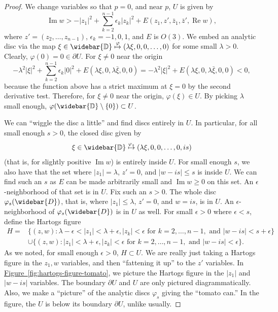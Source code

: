\documentclass[12pt,openany]{book}
\renewcommand{\Re}{\operatorname{Re}}
\renewcommand{\Im}{\operatorname{Im}}
\newcommand{\sabs}[1]{\lvert {#1} \rvert}
\newcommand{\D}{{\mathbb{D}}}
\theoremstyle{plain}
\theoremstyle{remark}
\theoremstyle{definition}
\theoremstyle{exercise}
\theoremstyle{example}
\newcommand{\figureref}[1]{\hyperref[#1]{Figure~\ref*{#1}}}
\begin{document}
\begin{proof}
We change variables so that $p = 0$, and
near $p$, $U$ is given by
\begin{equation*}
\Im w > -\sabs{z_1}^2 + \sum_{k=2}^{n-1} \epsilon_k \sabs{z_k}^2 +
E(z_1,z',\bar{z}_1,\bar{z}',\Re w) ,
\end{equation*}
where $z' = (z_2,\ldots,z_{n-1})$, $\epsilon_k = -1,0,1$, and $E$ is $O(3)$.
We embed an analytic disc via the map
$\xi \in \widebar{\D} \overset{\varphi}{\mapsto} (\lambda \xi, 0, 0, \ldots, 0)$
for some small $\lambda > 0$.
Clearly, $\varphi(0) = 0 \in \partial U$.  For $\xi \neq 0$ near the origin
\begin{equation*}
-\lambda^2 \sabs{\xi}^2 + \sum_{k=2}^{n-1} \epsilon_k \sabs{0}^2 + E(\lambda
\xi,0,\lambda \bar{\xi},0,0)
=
-\lambda^2 \sabs{\xi}^2 + E(\lambda
\xi,0,\lambda \bar{\xi},0,0)
< 0 ,
\end{equation*}
because
the function above has a strict maximum at $\xi = 0$
by the second derivative test.
Therefore, for $\xi \neq 0$ near the origin,
$\varphi(\xi) \in U$.  By picking $\lambda$ small enough,
$\varphi(\widebar{\D}\setminus\{0\}) \subset U$.

We can ``wiggle the disc a little'' and
find discs entirely in $U$.  In particular, for all small enough $s > 0$,
the closed disc given by
\begin{equation*}
\xi \in \widebar{\D} \overset{\varphi_s}{\mapsto} (\lambda \xi, 0, 0, \ldots, 0, i s)
\end{equation*}
(that is, for slightly positive $\Im w$)
is entirely inside $U$.
For small enough $s$, we also have that
the set where $\sabs{z_1} = \lambda$, $z' = 0$,
and $\sabs{w-is} \leq s$ is inside $U$.
We can find such an $s$ as $E$ can be made arbitrarily small
and $\Im w \geq 0$ on this set.
An $\epsilon$-neighborhood of that set is in $U$.
Fix such an $s > 0$.
The whole disc $\varphi_s(\widebar{D})$, that is,
where $\sabs{z_1} \leq \lambda$, $z'=0$, and $w=is$, is in $U$.
An $\epsilon$-neighborhood of $\varphi_s(\widebar{D})$ is in $U$ as well.
For small $\epsilon > 0$ where
$\epsilon < s$,
define the Hartogs figure
\begin{equation*}
\begin{split}
H =
& \bigl\{ (z,w) : \lambda - \epsilon < \sabs{z_1} < \lambda + \epsilon,
\sabs{z_k} < \epsilon \text{ for } k=2,\ldots,n-1, \text{ and }
\sabs{w-is} < s+\epsilon \bigr\}
\\
&
\cup
\bigl\{ (z,w) : \sabs{z_1} < \lambda + \epsilon,
\sabs{z_k} < \epsilon \text{ for } k=2,\ldots,n-1, \text{ and }
\sabs{w-is} < \epsilon \bigr\} .
\end{split}
\end{equation*}
As we noted,
for small enough $\epsilon >0$, $H \subset U$.
We are really just taking a Hartogs figure in the $z_1,w$ variables, and then
``fattening it up'' to the $z'$ variables.
In \figureref{fig:hartogs-figure-tomato}, we picture the Hartogs figure in the $\sabs{z_1}$ and $\sabs{w-is}$
variables.  The boundary $\partial U$ and $U$ are only pictured diagrammatically.
Also, we make a ``picture'' of the analytic discs $\varphi_s$ giving the ``tomato can.''
In the figure, the $U$ is below its boundary $\partial U$, unlike usually.


\end{proof}
\end{document}
